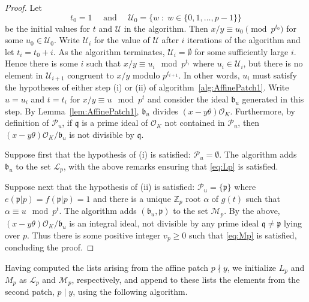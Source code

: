 \begin{proof}
Let 
\[t_0 = 1 \quad \text{ and } \quad \mathcal{U}_0=\{w \; :\;  w \in \{0,1,\dots,p-1\}\}\]
be the initial values for $t$ and $\mathcal{U}$ in the algorithm. Then $x/y \equiv u_0 \pmod{p^{t_0}}$ for some $u_0 \in \mathcal{U}_0$. Write $\mathcal{U}_i$ for the value of $\mathcal{U}$ after $i$ iterations of the algorithm  and let $t_i=t_0+i$. As the algorithm terminates, $\mathcal{U}_i = \emptyset$ for some sufficiently large $i$. Hence there is some $i$ such that $x/y \equiv u_i \mod{p^{t_i}}$ where $u_i \in \mathcal{U}_i$, but there is no element in $\mathcal{U}_{i+1}$ congruent to $x/y$ modulo $p^{t_{i+1}}$. In other words, $u_i$ must satisfy the hypotheses of either step (i) or (ii) of algorithm~\ref{alg:AffinePatch1}. Write $u=u_i$ and $t=t_i$ for $x/y \equiv u \mod{p^t}$ and consider the ideal $\mathfrak{b}_u$ generated in this step. By Lemma~\ref{lem:AffinePatch1}, $\mathfrak{b}_u$ divides $(x-y\theta) \mathcal{O}_K$. Furthermore, by definition of $\mathcal{P}_u$, if $\mathfrak{q}$ is a prime ideal of $\mathcal{O}_K$ not contained in $\mathcal{P}_u$, then $(x-y\theta)\mathcal{O}_K/\mathfrak{b}_u$ is not divisible by $\mathfrak{q}$. 

Suppose first that the hypothesis of (i) is satisfied: $\mathcal{P}_u = \emptyset$. The algorithm adds $\mathfrak{b}_u$ to the set $\mathcal{L}_p$, with the above remarks ensuring that \eqref{eq:Lp} is satisfied.

Suppose next that the hypothesis of (ii) is satisfied: $\mathcal{P}_u=\{\mathfrak{p}\}$ where ${e(\mathfrak{p}|p)=f(\mathfrak{p}|p)=1}$ and there is a unique $\mathbb{Z}_p$ root $\alpha$ of $g(t)$ such that $\alpha \equiv u \mod{p^t}$. The algorithm adds $(\mathfrak{b}_u,\mathfrak{p})$ to the set $\mathcal{M}_p$. By the above, $(x-y\theta)\mathcal{O}_K/\mathfrak{b}_u$ is an integral ideal, not divisible by any prime ideal $\mathfrak{q} \neq \mathfrak{p}$ lying over $p$. Thus there is some positive integer $v_p \geq 0$ such that \eqref{eq:Mp} is satisfied, concluding the proof. 
\end{proof}

Having computed the lists arising from the affine patch $p \nmid y$, we initialize $L_p$ and $M_p$ as $\mathcal{L}_p$ and $\mathcal{M}_p$, respectively, and append to these lists the elements from the second patch, $p \mid y$, using the following algorithm.  

